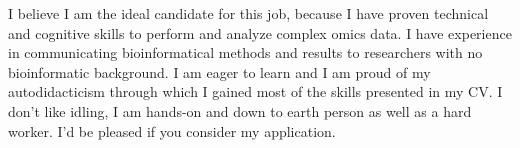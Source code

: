 \documentclass[11pt, a4paper]{awesome-cv}
\begin{document}
\begin{cvletter}
I believe I am the ideal candidate for this job, because I have proven technical and cognitive skills to perform and analyze complex omics data.
I have experience in communicating bioinformatical methods and results to researchers with no bioinformatic background.
I am eager to learn and I am proud of my autodidacticism through which I gained most of the skills presented in my CV.
I don't like idling, I am hands-on and down to earth person as well as a hard worker.
I'd be pleased if you consider my application.

\end{cvletter}


\makeletterclosing
\end{document}
